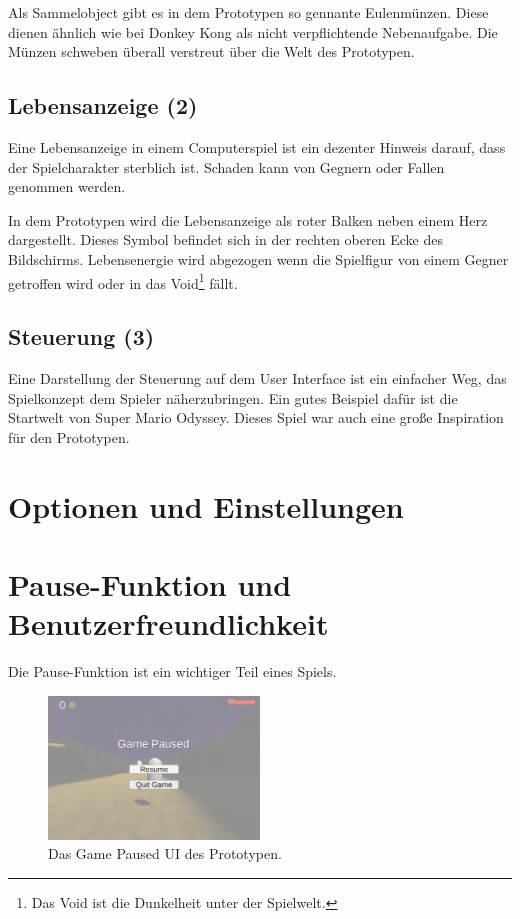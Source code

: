 Als Sammelobject gibt es in dem Prototypen so gennante \glqq Eulenmünzen\grqq. Diese dienen ähnlich wie bei Donkey Kong als nicht verpflichtende Nebenaufgabe. Die Münzen schweben überall verstreut über die Welt des Prototypen. 

\subsection{Lebensanzeige (2)}

Eine Lebensanzeige in einem Computerspiel ist ein dezenter Hinweis darauf, dass der Spielcharakter sterblich ist. Schaden kann von Gegnern oder Fallen genommen werden.

In dem Prototypen wird die Lebensanzeige als roter Balken neben einem Herz dargestellt. Dieses Symbol befindet sich in der rechten oberen Ecke des Bildschirms. Lebensenergie wird abgezogen wenn die Spielfigur von einem Gegner getroffen wird oder in das Void\footnote[1]{Das Void ist die Dunkelheit unter der Spielwelt.} fällt.

\subsection{Steuerung (3)}

Eine Darstellung der Steuerung auf dem User Interface ist ein einfacher Weg, das Spielkonzept dem Spieler näherzubringen. Ein gutes Beispiel dafür ist die Startwelt von Super Mario Odyssey. Dieses Spiel war auch eine große Inspiration für den Prototypen. 

\section{Optionen und Einstellungen}


\section{Pause-Funktion und Benutzerfreundlichkeit}
Die Pause-Funktion ist ein wichtiger Teil eines Spiels. 


\begin{figure}[H]
  \centering
  \includegraphics[width=0.5\textwidth]{chapters/03/images/GamePaused.png}
  \caption{Das Game Paused UI des Prototypen.}
  \label{luk01}
\end{figure}